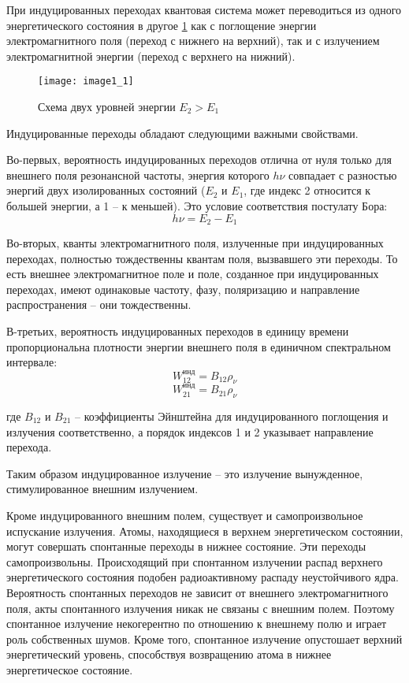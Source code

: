 
При индуцированных переходах квантовая система может переводиться из одного 
энергетического состояния в другое \ref{img1.1} как с поглощение энергии 
электромагнитного поля (переход с нижнего на верхний), так и с излучением 
электромагнитной энергии (переход с верхнего на нижний).

\begin{figure}[h!]
	\center
	\texttt{[image: image1\_1]} \\
	\caption{Схема двух уровней энергии \( E_2 > E_1 \)}
	\label{img1.1}
\end{figure}

Индуцированные переходы обладают следующими важными свойствами.

Во-первых, вероятность индуцированных переходов отлична от нуля только для 
внешнего поля резонансной частоты, энергия которого \( h\nu \) совпадает с 
разностью энергий двух изолированных состояний (\( E_2 \) и \( E_1 \), где 
индекс 2 относится к большей энергии, а 1 -- к меньшей). Это условие 
соответствия постулату Бора:
\[
	h\nu = E_2 - E_1
\]

Во-вторых, кванты электромагнитного поля, излученные при индуцированных 
переходах, полностью тождественны квантам поля, вызвавшего эти переходы. 
То есть внешнее электромагнитное поле и поле, созданное при индуцированных 
переходах, имеют одинаковые частоту, фазу, поляризацию и направление 
распространения -- они тождественны.

В-третьих, вероятность индуцированных переходов в единицу времени 
пропорциональна плотности энергии внешнего поля в единичном спектральном 
интервале:
\[
	W_{12}^\text{инд} = B_{12}\rho_\nu
\]
\[
	W_{21}^\text{инд} = B_{21}\rho_\nu
\]

где \( B_{12} \) и  \( B_{21} \) -- коэффициенты Эйнштейна для индуцированного 
поглощения и излучения соответственно, а порядок индексов 1 и 2 указывает 
направление перехода.

Таким образом индуцированное излучение -- это излучение вынужденное, 
стимулированное внешним излучением. 

Кроме индуцированного внешним полем, существует и самопроизвольное испускание 
излучения. Атомы, находящиеся в верхнем энергетическом состоянии, могут 
совершать спонтанные переходы в нижнее состояние. Эти переходы 
самопроизвольны. Происходящий при спонтанном излучении распад верхнего 
энергетического состояния подобен радиоактивному распаду неустойчивого ядра. 
Вероятность спонтанных переходов не зависит от внешнего электромагнитного 
поля, акты спонтанного излучения никак не связаны с внешним полем. Поэтому 
спонтанное излучение некогерентно по отношению к внешнему полю и играет 
роль собственных шумов. Кроме того, спонтанное излучение опустошает верхний 
энергетический уровень, способствуя возвращению атома в нижнее энергетическое 
состояние.

